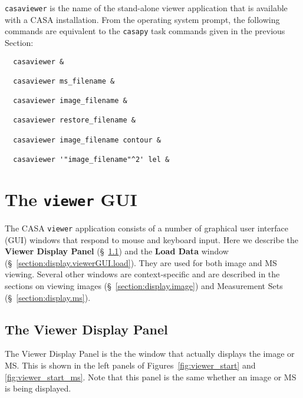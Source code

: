 {\tt casaviewer} is the name of the stand-alone viewer application that
is available with a CASA installation.  From the operating system prompt,
the following commands are equivalent to the {\tt casapy} task commands
given in the previous Section:

\small
\begin{verbatim}
  casaviewer &
  
  casaviewer ms_filename &
  
  casaviewer image_filename &
  
  casaviewer restore_filename &
  
  casaviewer image_filename contour &
  
  casaviewer '"image_filename"^2' lel &
\end{verbatim}
\normalsize

\section{The {\tt viewer} GUI}
\label{section:display.viewerGUI}

The CASA {\tt viewer} application consists of a number of
graphical user interface (GUI) windows that respond to mouse and
keyboard input.  Here we describe the {\bf Viewer Display Panel} 
(\S~\ref{section:display.viewerGUI.displaypanel}) and the
{\bf Load Data} window (\S~\ref{section:display.viewerGUI.load}).
They are used for both image and MS viewing.  Several other windows
are context-specific and are described in the sections on viewing
images (\S~\ref{section:display.image}) and Measurement Sets
(\S~\ref{section:display.ms}).


\subsection{The Viewer Display Panel}
\label{section:display.viewerGUI.displaypanel}

 
The Viewer Display Panel is the the window that actually displays the
image or MS.  This is shown in the left panels of 
Figures~\ref{fig:viewer_start} and \ref{fig:viewer_start_ms}.
Note that this panel is the same whether an image or MS is
being displayed.
 
